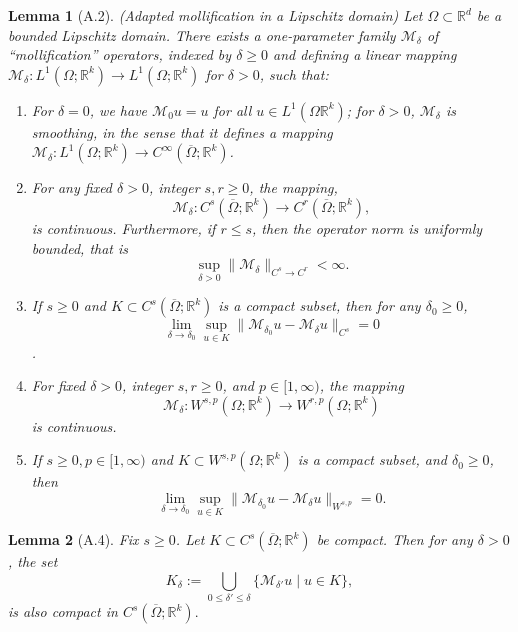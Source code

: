 \documentclass[reqno]{amsart}
\theoremstyle{plain}
\newtheorem{lem}{Lemma}
\theoremstyle{definition}
\newcommand{\bb}[1]{\mathbb{#1}}
\newcommand{\cal}[1]{\mathcal{#1}}
\begin{document}
\begin{lem}[A.2](Adapted mollification in a Lipschitz domain) \label{A.2}
    Let $\Omega \subset \bb R^d$ be a bounded Lipschitz domain. There exists a one-parameter family $\cal M_\delta$ of ``mollification'' operators, indexed by $\delta \geq 0$ and defining a linear mapping $\cal M_\delta :L^1(\Omega;\bb R^k) \to L^1(\Omega; \bb R^k)$ for $\delta > 0$, such that:
    \begin{enumerate}
        \item For $\delta = 0$, we have $\cal M_0u = u$ for all $u \in L^1(\Omega \bb R^k)$; for $\delta > 0$, $\cal M_\delta$ is smoothing, in the sense that it defines a mapping $\cal M_\delta :L^1(\Omega;\bb R^k)\to C^\infty(\overline{\Omega};\bb R^k)$.
        \item For any fixed $\delta > 0$, integer $s,r \geq 0$, the mapping, $$ \cal M_\delta : C^s(\overline{\Omega};\bb R^k) \to C^r(\overline{\Omega};\bb R^k),$$ is continuous. Furthermore, if $r \leq s$, then the operator norm is uniformly bounded, that is $$\sup\limits_{\delta>0} \|\cal M_\delta\|_{C^s \to C^r} < \infty.$$
        \item If $s \geq 0$ and $K \subset C^s(\overline{\Omega};\bb R^k)$ is a compact subset, then for any $\delta_0 \geq 0$, $$ \lim_{\delta \to \delta_0} \sup_{u \in K} \|\cal M_{\delta_0} u - \cal M_\delta u\|_{C^s} = 0$$.
        \item For fixed $\delta > 0$, integer $s,r \geq 0$, and $p \in [1,\infty)$, the mapping $$\cal M_\delta : W^{s,p}(\Omega;\bb R^k) \to W^{r,p}(\Omega;\bb R^k)$$ is continuous.
        \item If $s \geq 0, p \in [1, \infty)$ and $K \subset W^{s,p}(\Omega;\bb R^k)$ is a compact subset, and $\delta_0 \geq 0$, then $$ \lim_{\delta \to \delta_0}\sup_{u \in K}\|\cal M_{\delta_0}u - \cal M_\delta u\|_{W^{s,p}} = 0.$$
    \end{enumerate}
\end{lem}
\begin{lem}[A.4]\label{A.4}
    Fix $s \geq 0$. Let $K \subset C^s(\overline{\Omega};\bb R^k)$ be compact. Then for any $\delta > 0$, the set 
    $$ K_\delta := \bigcup\limits_{0\leq \delta' \leq \delta} \{\cal M_{\delta'}u \mid u\in K\},$$
    is also compact in $C^s(\overline{\Omega};\bb R^k).$
\end{lem}
\end{document}
